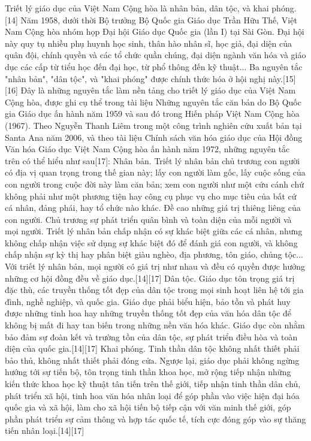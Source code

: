 \documentclass[../thesis.tex]{subfiles}
\begin{document}
Triết lý giáo dục của Việt Nam Cộng hòa là nhân bản, dân tộc, và khai phóng.[14]
Năm 1958, dưới thời Bộ trưởng Bộ Quốc gia Giáo dục Trần Hữu Thế, Việt Nam Cộng hòa nhóm họp Đại hội Giáo dục Quốc gia (lần I) tại Sài Gòn. Đại hội này quy tụ nhiều phụ huynh học sinh, thân hào nhân sĩ, học giả, đại diện của quân đội, chính quyền và các tổ chức quần chúng, đại diện ngành văn hóa và giáo dục các cấp từ tiểu học đến đại học, từ phổ thông đến kỹ thuật... Ba nguyên tắc "nhân bản", "dân tộc", và "khai phóng" được chính thức hóa ở hội nghị này.[15][16] Đây là những nguyên tắc làm nền tảng cho triết lý giáo dục của Việt Nam Cộng hòa, được ghi cụ thể trong tài liệu Những nguyên tắc căn bản do Bộ Quốc gia Giáo dục ấn hành năm 1959 và sau đó trong Hiến pháp Việt Nam Cộng hòa (1967). Theo Nguyễn Thanh Liêm trong một công trình nghiên cứu xuất bản tại Santa Ana năm 2006, và theo tài liệu Chính sách văn hóa giáo dục của Hội đồng Văn hóa Giáo dục Việt Nam Cộng hòa ấn hành năm 1972, những nguyên tắc trên có thể hiểu như sau[17]:
Nhân bản. Triết lý nhân bản chủ trương con người có địa vị quan trọng trong thế gian này; lấy con người làm gốc, lấy cuộc sống của con người trong cuộc đời này làm căn bản; xem con người như một cứu cánh chứ không phải như một phương tiện hay công cụ phục vụ cho mục tiêu của bất cứ cá nhân, đảng phái, hay tổ chức nào khác. Đề cao những giá trị thiêng liêng của con người. Chủ trương sự phát triển quân bình và toàn diện của mỗi người và mọi người. Triết lý nhân bản chấp nhận có sự khác biệt giữa các cá nhân, nhưng không chấp nhận việc sử dụng sự khác biệt đó để đánh giá con người, và không chấp nhận sự kỳ thị hay phân biệt giàu nghèo, địa phương, tôn giáo, chủng tộc... Với triết lý nhân bản, mọi người có giá trị như nhau và đều có quyền được hưởng những cơ hội đồng đều về giáo dục.[14][17]
Dân tộc. Giáo dục tôn trọng giá trị đặc thù, các truyền thống tốt đẹp của dân tộc trong mọi sinh hoạt liên hệ tới gia đình, nghề nghiệp, và quốc gia. Giáo dục phải biểu hiện, bảo tồn và phát huy được những tinh hoa hay những truyền thống tốt đẹp của văn hóa dân tộc để không bị mất đi hay tan biến trong những nền văn hóa khác. Giáo dục còn nhằm bảo đảm sự đoàn kết và trường tồn của dân tộc, sự phát triển điều hòa và toàn diện của quốc gia.[14][17]
Khai phóng. Tinh thần dân tộc không nhất thiết phải bảo thủ, không nhất thiết phải đóng cửa. Ngược lại, giáo dục phải không ngừng hướng tới sự tiến bộ, tôn trọng tinh thần khoa học, mở rộng tiếp nhận những kiến thức khoa học kỹ thuật tân tiến trên thế giới, tiếp nhận tinh thần dân chủ, phát triển xã hội, tinh hoa văn hóa nhân loại để góp phần vào việc hiện đại hóa quốc gia và xã hội, làm cho xã hội tiến bộ tiếp cận với văn minh thế giới, góp phần phát triển sự cảm thông và hợp tác quốc tế, tích cực đóng góp vào sự thăng tiến nhân loại.[14][17]
\end{document}
